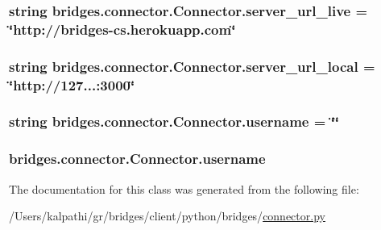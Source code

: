 \subsubsection[{server\+\_\+url\+\_\+live}]{\setlength{\rightskip}{0pt plus 5cm}string bridges.\+connector.\+Connector.\+server\+\_\+url\+\_\+live = \char`\"{}http\+://bridges-\/cs.\+herokuapp.\+com\char`\"{}\hspace{0.3cm}{\ttfamily [static]}}\label{classbridges_1_1connector_1_1_connector_a10c26bfaf2718f837e7bddfd7715b729}
\hypertarget{classbridges_1_1connector_1_1_connector_a7d58b50fbd7d10f805957ec620135ef7}{}
\subsubsection[{server\+\_\+url\+\_\+local}]{\setlength{\rightskip}{0pt plus 5cm}string bridges.\+connector.\+Connector.\+server\+\_\+url\+\_\+local = \char`\"{}http\+://127...\+:3000\char`\"{}\hspace{0.3cm}{\ttfamily [static]}}\label{classbridges_1_1connector_1_1_connector_a7d58b50fbd7d10f805957ec620135ef7}
\hypertarget{classbridges_1_1connector_1_1_connector_af2f4f996092cf63a5e7940ca93a2c6b7}{}
\subsubsection[{username}]{\setlength{\rightskip}{0pt plus 5cm}string bridges.\+connector.\+Connector.\+username = \char`\"{}\char`\"{}\hspace{0.3cm}{\ttfamily [static]}}\label{classbridges_1_1connector_1_1_connector_af2f4f996092cf63a5e7940ca93a2c6b7}
\hypertarget{classbridges_1_1connector_1_1_connector_adeb8d1b493eae70c24127fb175e1bfe7}{}
\subsubsection[{username}]{\setlength{\rightskip}{0pt plus 5cm}bridges.\+connector.\+Connector.\+username}\label{classbridges_1_1connector_1_1_connector_adeb8d1b493eae70c24127fb175e1bfe7}


The documentation for this class was generated from the following file\+:\begin{DoxyCompactItemize}
\item 
/\+Users/kalpathi/gr/bridges/client/python/bridges/\hyperlink{connector_8py}{connector.\+py}\end{DoxyCompactItemize}
